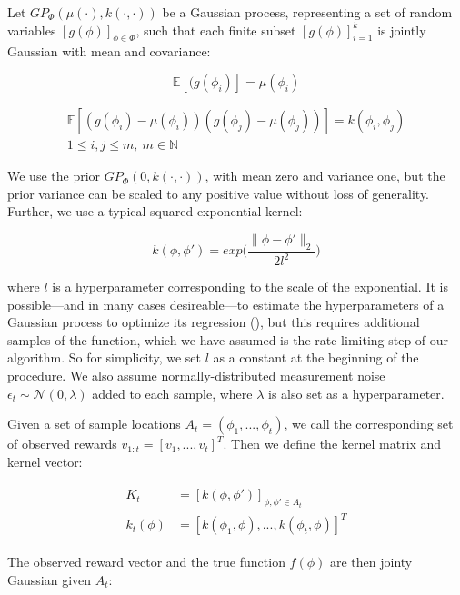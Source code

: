\documentclass[letterpaper, 10 pt, conference]{ieeeconf}
\begin{document}
Let $GP_\Phi(\mu(\cdot),k(\cdot,\cdot))$ be a Gaussian process, representing a set of random variables $[g(\phi)]_{\phi\in\Phi}$, such that each finite subset $[g(\phi)]_{i=1}^k$ is jointly Gaussian with mean and covariance:

\begin{equation}
    \mathbb{E}[(g(\phi_i)] = \mu(\phi_i)
    \label{eq:jointmean}
\end{equation}

\begin{multline}
    \mathbb{E}[(g(\phi_i)-\mu(\phi_i))(g(\phi_j)-\mu(\phi_j))]=k(\phi_i,\phi_j) \\
    1\leq i,j\leq m,\ m\in \mathbb{N}
    \label{eq:jointcov}
\end{multline}
\smallskip

We use the prior $GP_\Phi(0,k(\cdot,\cdot))$, with mean zero and variance one, but the prior variance can be scaled to any positive value without loss of generality. Further, we use a typical squared exponential kernel:

\begin{equation}
    k(\phi,\phi') = exp\bigg(\frac{\|\phi-\phi'\|_2}{2l^2}\bigg)
\end{equation}

where $l$ is a hyperparameter corresponding to the scale of the exponential. It is possible---and in many cases desireable---to estimate the hyperparameters of a Gaussian process to optimize its regression (\cite{blum13,chen16}), but this requires additional samples of the function, which we have assumed is the rate-limiting step of our algorithm. So for simplicity, we set $l$ as a constant at the beginning of the procedure. We also assume normally-distributed measurement noise $\epsilon_t\sim\mathcal{N}(0,\lambda)$ added to each sample, where $\lambda$ is also set as a hyperparameter.

Given a set of sample locations $A_t=(\phi_1,...,\phi_t)$, we call the corresponding set of observed rewards $v_{1:t}=[v_1,...,v_t]^T$. Then we define the kernel matrix and kernel vector:

\begin{align}
\begin{split}
    K_t &= [k(\phi,\phi')]_{\phi,\phi'\in A_t} \\
    k_t(\phi) &= [k(\phi_1,\phi),...,k(\phi_t,\phi)]^T
\end{split}
\end{align}
\smallskip

The observed reward vector and the true function $f(\phi)$ are then jointy Gaussian given $A_t$:
\end{document}
